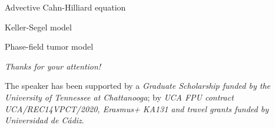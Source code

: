 		\begin{frame}{Advective Cahn-Hilliard equation}
			
		\end{frame}

		\begin{frame}{Keller-Segel model}
			
		\end{frame}

		\begin{frame}{Phase-field tumor model}
			
		\end{frame}


\begin{frame}{}
	\centering
	\vspace*{1cm}
	{\Huge
		\emph{Thanks for your attention!}}
	
	\vspace*{0.5cm}
	
	\vspace*{1cm}
	\begin{acknowledgements}
		The speaker has been supported by a \textit{Graduate Scholarship funded by the University of Tennessee at Chattanooga}; by \textit{UCA FPU contract UCA/REC14VPCT/2020, Erasmus+ KA131 and travel grants funded by Universidad de Cádiz}.
	\end{acknowledgements}
\end{frame}
